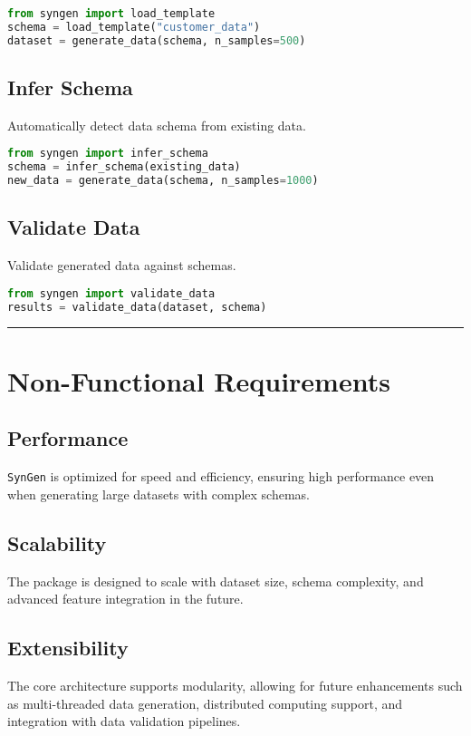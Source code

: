 \documentclass{article}
\newcommand{\horizbar}{
    \vspace{1em}
    \hrule height 1pt
    \vspace{1em}
}
\begin{document}
    \begin{lstlisting}[language=Python, caption=API Example: Load Template]
from syngen import load_template
schema = load_template("customer_data")
dataset = generate_data(schema, n_samples=500)
    \end{lstlisting}

    \subsection{Infer Schema}
    Automatically detect data schema from existing data.

    \begin{lstlisting}[language=Python, caption=API Example: Schema Inference]
from syngen import infer_schema
schema = infer_schema(existing_data)
new_data = generate_data(schema, n_samples=1000)
    \end{lstlisting}

    \subsection{Validate Data}
    Validate generated data against schemas.

    \begin{lstlisting}[language=Python, caption=API Example: Data Validation]
from syngen import validate_data
results = validate_data(dataset, schema)
    \end{lstlisting}

    \horizbar


    \section{Non-Functional Requirements}

    \subsection{Performance}
    \texttt{SynGen} is optimized for speed and efficiency, ensuring high performance even when generating large datasets with complex schemas.

    \subsection{Scalability}
    The package is designed to scale with dataset size, schema complexity, and advanced feature integration in the future.

    \subsection{Extensibility}
    The core architecture supports modularity, allowing for future enhancements such as multi-threaded data generation, distributed computing support, and integration with data validation pipelines.
\end{document}

